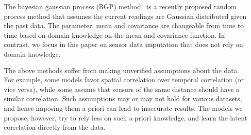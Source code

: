 %

The bayesian gaussian process (BGP) method~\cite{osborne2012real} is a
recently proposed random process method that assumes the current
readings are Gaussian distributed given the past data.  The parameter,
mean and covariance are changeable from time to time based on domain
knowledge on the mean and covariance function.  In contrast, we focus
in this paper on sensor data imputation that does not rely on domain
knowledge.

The above methods suffer from making unverified assumptions about the
data. For example, some models favor spatial correlation over temporal
correlation (or vice versa), while some assume that sensors of the
same distance should have a similar correlation.
Such assumptions may or may not hold
for various datasets, and hence imposing them a priori can lead to
inaccurate results.  The models we propose, however, try to rely less
on such a priori knowledge, and learn the latent correlation directly
from the data.

